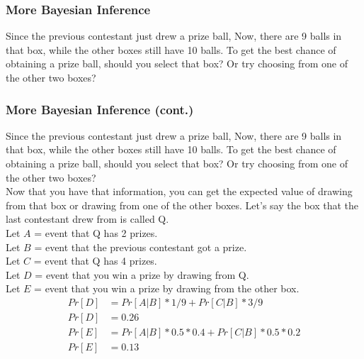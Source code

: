 \documentclass[9pt]{beamer}
\begin{document}
\begin{frame}
  \frametitle{More Bayesian Inference}
Since the previous contestant just drew a prize ball, Now, there are 9 balls in that box, while the other boxes still have 10 balls. To get the best chance of obtaining a prize ball, should you select that box? Or try choosing from one of the other two boxes?\\
\end{frame}

\begin{frame}
  \frametitle{More Bayesian Inference (cont.)}
Since the previous contestant just drew a prize ball, Now, there are 9 balls in that box, while the other boxes still have 10 balls. To get the best chance of obtaining a prize ball, should you select that box? Or try choosing from one of the other two boxes?\\
\alert<1>{
Now that you have that information, you can get the expected value of drawing from that box or drawing from one of the other boxes. Let's say the box that the last contestant drew from is called Q.\\

Let $A$ = event that Q has 2 prizes. \\
Let $B$ = event that the previous contestant got a prize. \\
Let $C$ = event that Q has 4 prizes.\\
Let $D$ = event that you win a prize by drawing from Q. \\
Let $E$ = event that you win a prize by drawing from the other box.
\begin{align*}
Pr[D] &= Pr[A | B] * 1/9 + Pr[C | B] * 3 / 9 \\
Pr[D] &= 0.26\\
Pr[E] &= Pr[A | B] * 0.5 * 0.4 + Pr[C | B] * 0.5*0.2\\
Pr[E]  &= 0.13
\end{align*}
}
\end{frame}
\end{document}
